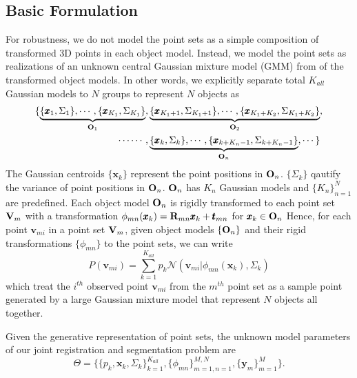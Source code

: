 \subsection{Basic Formulation}
For robustness, we do not model the point sets as a simple composition of transformed 3D points in each object model. Instead, we model the point sets as realizations of an unknown central Gaussian mixture model (GMM) from of the transformed object models. In other words, we explicitly separate total $K_{all}$ Gaussian models to $N$ groups to represent $N$ objects as
\begin{equation}
\begin{aligned}
\{
\underbrace{ \{\pmb{x}_{1},\Sigma_{1}\}, \cdots, \{\pmb{x}_{K_1},\Sigma_{K_1}\}  }_{\mathbf{O}_1},&\underbrace{ \{\pmb{x}_{K_1+1},\Sigma_{K_1+1}\}, \cdots, \{\pmb{x}_{K_1+K_2},\Sigma_{K_1+K_2}\}  }_{\mathbf{O}_2},\\ 
\cdots \cdots,& 
\underbrace{ \{\pmb{x}_{k},\Sigma_{k}\}, \cdots, \{\pmb{x}_{k+K_n-1},\Sigma_{k+K_n-1}\}  }_{\mathbf{O}_n},\cdots \}
\end{aligned}
\end{equation}
The Gaussian centroids $\{\pmb{x}_{k}\}$ represent the point positions in $\mathbf{O}_{n}$. $\{\Sigma_{k}\}$ qautify the variance of point positions in $\mathbf{O}_{n}$. $\mathbf{O}_n$ has $K_n$ Gaussian models and $\{K_n\}_{n=1}^N$ are predefined.
Each object model $\mathbf{O}_{n}$ is rigidly transformed to each point set $\mathbf{V}_m$ with a transformation $\phi_{mn}(\pmb{x}_{k})=\mathbf{R}_{mn}\pmb{x}_{k}+\pmb{t}_{mn}$ for $\pmb{x}_{k} \in \mathbf{O}_n$
%
Hence, for each point $\pmb{v}_{mi}$ in a point set $\mathbf{V}_m$, given object models $\{\mathbf{O}_{n}\}$ and their rigid transformations $\{\phi_{mn}\}$ to the point sets, we can write
\begin{equation}
\label{equ:model}
P(\pmb{v}_{mi})=\sum^{K_{all}}_{k=1}p_k\mathcal{N}(\pmb{v}_{mi}|\phi_{mn}(\pmb{x}_k),\Sigma_k)
\end{equation}
which treat the $i^{th}$ observed point $\pmb{v}_{mi}$ from the $m^{th}$ point set as a sample point generated by a large Gaussian mixture model that represent $N$ objects all together.

Given the generative representation of point sets, the unknown model parameters of our joint registration and segmentation problem are
%
\begin{displaymath}
\varTheta=\big \{\{p_k,\pmb{x}_{k},\Sigma_k\}_{k=1}^{K_{all}},\{\phi_{mn}\}_{m=1,n=1}^{M,N}, \{\pmb{y}_{m}\}^{M}_{m=1}\big\}.
\end{displaymath}
 
